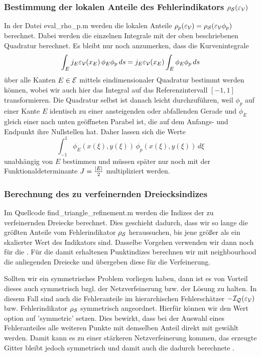 \subsubsection{Bestimmung der lokalen Anteile des Fehlerindikators $\rho_{\mathcal S}(\varepsilon_{\mathcal V})$}

In der Datei {\ttfamily eval_rho_p.m} werden die lokalen Anteile $\rho_p (\varepsilon_{\mathcal V}) = \rho_{\mathcal S}(\varepsilon_{\mathcal V}\phi_p)$ berechnet. Dabei werden die einzelnen Integrale mit der oben beschriebenen Quadratur berechnet. Es bleibt nur noch anzumerken, dass die Kurvenintegrale
\[
	\int_E j_E \varepsilon_{\mathcal V}(x_E) \, \phi_E \phi_p \, ds = j_E \varepsilon_{\mathcal V}(x_E) \int_E \phi_E \phi_p \, ds
\]
über alle Kanten $E \in \mathcal E$ mittels eindimensionaler Quadratur bestimmt werden können, wobei wir auch hier das Integral auf das Referenzintervall $[-1,1]$ transformieren. Die Quadratur selbst ist danach leicht durchzuführen, weil $\phi_p$ auf einer Kante $E$ identisch zu einer ansteigenden oder abfallenden Gerade und $\phi_E$ gleich einer nach unten geöffneten Parabel ist, die auf dem Anfangs- und Endpunkt ihre Nullstellen hat. Daher lassen sich die Werte
\[
	\int_{-1}^1  \phi_E(x(\xi),y(\xi))  \, \phi_p(x(\xi),y(\xi)) \, d\xi
\]
unabhängig von $E$ bestimmen und müssen später nur noch mit der Funktionaldeterminante $J=\frac{\lvert E\rvert}2$ multipliziert werden.


\subsubsection{Berechnung des zu verfeinernden Dreiecksindizes}

Im Quellcode {\ttfamily find_triangle_refinement.m} werden die Indizes der zu verfeinernden Dreiecke berechnet. Dies geschieht dadurch, dass wir so lange die  größten Anteile vom Fehlerindikator $\rho_{\mathcal S}$ heraussuchen, bis jene größer als ein skalierter Wert des Indikators sind. Dasselbe Vorgehen verwenden wir dann noch für die . Für die damit erhaltenen Punktindizes berechnen wir mit {\ttfamily neighbourhood} die anliegenden Dreiecke und übergeben diese für die Verfeinerung.

Sollten wir ein symmetrisches Problem vorliegen haben, dann ist es von Vorteil dieses auch symmetrisch bzgl. der Netzverfeinerung bzw. der Lösung zu halten. In diesem Fall sind auch die Fehleranteile im hierarchischen Fehlerschätzer $-\mathcal I_{\mathcal Q}(\varepsilon_{\mathcal V})$ bzw. Fehlerindikator $\rho_{\mathcal S}$ symmetrisch angeordnet. Hierfür können wir den Wert {\ttfamily option} auf {\ttfamily 'symmetric'} setzen. Dies bewirkt, dass bei der Auswahl eines Fehleranteiles alle weiteren Punkte mit demselben Anteil direkt mit gewählt werden. Damit kann es zu einer stärkeren Netzverfeinerung kommen, das erzeugte Gitter bleibt jedoch symmetrisch und damit auch die dadurch berechnete .








